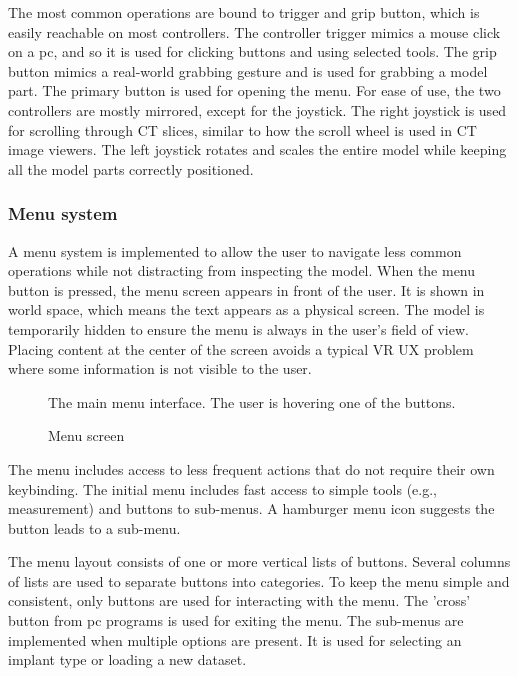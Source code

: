 \documentclass[a4paper]{report}
\begin{document}
The most common operations are bound to trigger and grip button, which is easily reachable on most controllers. The controller trigger mimics a mouse click on a pc, and so it is used for clicking buttons and using selected tools. The grip button mimics a real-world grabbing gesture and is used for grabbing a model part.
The primary button is used for opening the menu.
For ease of use, the two controllers are mostly mirrored, except for the joystick. The right joystick is used for scrolling through CT slices, similar to how the scroll wheel is used in CT image viewers. The left joystick rotates and scales the entire model while keeping all the model parts correctly positioned.

\subsubsection{Menu system}
A menu system is implemented to allow the user to navigate less common operations while not distracting from inspecting the model.
When the menu button is pressed, the menu screen appears in front of the user. It is shown in world space, which means the text appears as a physical screen. The model is temporarily hidden to ensure the menu is always in the user's field of view. Placing content at the center of the screen avoids a typical VR UX problem where some information is not visible to the user.

\begin{figure}[h!]
    \centering
	\hfill
  \caption{Menu screen}
  \small
  The main menu interface. The user is hovering one of the buttons.
\end{figure}

The menu includes access to less frequent actions that do not require their own keybinding. The initial menu includes fast access to simple tools (e.g., measurement) and buttons to sub-menus. A hamburger menu icon suggests the button leads to a sub-menu.

The menu layout consists of one or more vertical lists of buttons. Several columns of lists are used to separate buttons into categories. To keep the menu simple and consistent, only buttons are used for interacting with the menu. The 'cross' button from pc programs is used for exiting the menu.
The sub-menus are implemented when multiple options are present. It is used for selecting an implant type or loading a new dataset.
\end{document}
